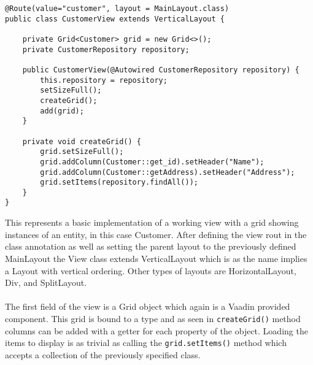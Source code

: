 \begin{lstlisting}[caption=Creating a Vaadin view]
@Route(value="customer", layout = MainLayout.class)
public class CustomerView extends VerticalLayout {
    
    private Grid<Customer> grid = new Grid<>();
    private CustomerRepository repository;
    
    public CustomerView(@Autowired CustomerRepository repository) {
        this.repository = repository;
        setSizeFull();
        createGrid();            
        add(grid);
    }
    
    private void createGrid() {
        grid.setSizeFull();
        grid.addColumn(Customer::get_id).setHeader("Name");
        grid.addColumn(Customer::getAddress).setHeader("Address");
        grid.setItems(repository.findAll());
    }
}
\end{lstlisting}
This represents a basic implementation of a working view with a grid showing instances of an entity, in this case Customer.
After defining the view rout in the class annotation as well as setting the parent layout to the previously defined 
MainLayout the View class extends VerticalLayout which is as the name implies a Layout with vertical ordering. 
Other types of layouts are HorizontalLayout, Div, and SplitLayout.\parencite{vaadinDocs}\paragraph{}
The first field of the view is a Grid object which again is a Vaadin provided component. 
This grid is bound to a type and as seen in \lstinline[columns=fixed]{createGrid()} method columns can be added with
a getter for each property of the object. 
Loading the items to display is as trivial as calling the \lstinline[columns=fixed]{grid.setItems()} method which
accepts a collection of the previously specified class. 